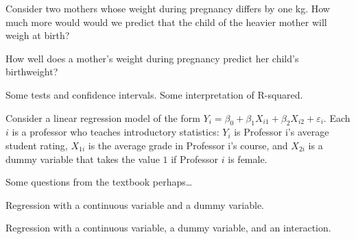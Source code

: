 \documentclass[addpoints,12pt]{exam}
\begin{document}
\begin{questions}
\question Consider two mothers whose weight during pregnancy differs by one kg.
How much more would would we predict that the child of the heavier mother will weigh at birth? 

\question How well does a mother's weight during pregnancy predict her child's birthweight? 

\question Some tests and confidence intervals. Some interpretation of R-squared.

\question Consider a linear regression model of the form $Y_i = \beta_0 + \beta_1 X_{i1} + \beta_2 X_{i2} + \varepsilon_i$.
Each $i$ is a professor who teaches introductory statistics: $Y_i$ is Professor i's average student rating, $X_{1i}$ is the average grade in Professor i's course, and $X_{2i}$ is a dummy variable that takes the value $1$ if Professor $i$ is female.



\question Some questions from the textbook perhaps\dots
 

\question Regression with a continuous variable and a dummy variable.

\question Regression with a continuous variable, a dummy variable, and an interaction.

\end{questions}
\end{document}

